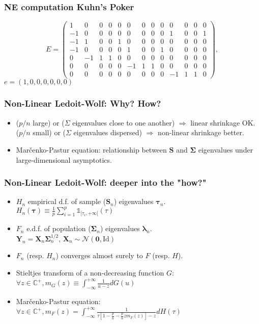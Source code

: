 \documentclass[xcolor=dvipsnames]{beamer}
\def\B#1{\bm{#1}}
\begin{document}
\begin{frame}
  \frametitle{NE computation Kuhn's Poker}
  \[   E = \left( \begin{array}{ccccccccccccc}
1&0&0&0&0&0&0&0&0&0&0&0&0\\-1&0&0&0&0&0&0&0&0&1&0&0&1\\-1&1&0&0&1&0&0&0&0&0&0&0&0\\-1&0&0&0&0&1&0&0&1&0&0&0&0\\0&-1&1&1&0&0&0&0&0&0&0&0&0\\0&0&0&0&0&-1&1&1&0&0&0&0&0\\0&0&0&0&0&0&0&0&0&-1&1&1&0
\end{array} \right),\]
  $e = (1, 0, 0, 0, 0, 0, 0)$

\end{frame}

\begin{frame}
  \frametitle{Non-Linear Ledoit-Wolf: Why? How?}

  \begin{itemize}
  \item ($p/n$ large) or ($\Sigma$ eigenvalues close to one another)
    $\Rightarrow$ linear shrinkage OK.\\($p/n$ small) or ($\Sigma$
    eigenvalues dispersed) $\Rightarrow$ non-linear shrinkage better.
  \item Mar\v{c}enko-Pastur equation: relationship between $\B{S}$ and
    $\B{\Sigma}$ eigenvalues under large-dimensional asymptotics.
  \end{itemize}
\end{frame}

\begin{frame}
  \frametitle{Non-Linear Ledoit-Wolf: deeper into the "how?"}

  \begin{itemize}
  \item $H_n$ empirical d.f. of sample ($\B{S}_n$) eigenvalues $\B{\tau}_n$.\\
    $H_n(\B{\tau}) \equiv
    \frac{1}{p}\sum^p_{i=1}\mathbb{1}_{[\tau_i,+\infty[}(\tau)$
  \item $F_n$ e.d.f. of population ($\B{\Sigma}_n$) eigenvalues
    $\B{\lambda}_n$.\\$\B{Y}_n = \B{X}_n\B{\Sigma}^{1/2}_n$, $\B{X}_n
    \sim \mathcal{N}(\B{0},\text{Id})$
  \item $F_n$ (resp. $H_n$) converges almost surely to $F$ (resp. $H$).
  \item Stieltjes transform of a non-decreasing function $G$:
     $\forall z \in \mathbb{C}^+, m_G(z) \equiv
     \int^{+\infty}_{-\infty}\frac{1}{u - z}dG(u)$
   \item Mar\v{c}enko-Pastur equation: $\forall z \in \mathbb{C}^+,
     m_F(z) = \int^{+\infty}_{-\infty}\frac{1}{\tau[1-\frac{p}{n}-\frac{p}{n}zm_F(z)] - z}dH(\tau)$
  \end{itemize}
\end{frame}
\end{document}
